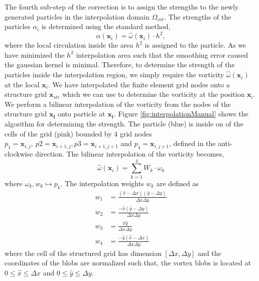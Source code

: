 The fourth sub-step of the correction is to assign the strengths to the newly generated particles in the interpolation domain $\Omega_{int}$. The strengths of the particles $\alpha_i$ is determined using the standard method,
\begin{equation}
\alpha(\mathbf{x}_i) = \hat{\omega}(\mathbf{x}_i) \cdot h^2,
\end{equation}
where the local circulation inside the area $h^2$ is assigned to the particle. As we have minimized the $h^2$ interpolation area such that the smoothing error caused the gaussian kernel is minimal. Therefore, to determine the strength of the particles inside the interpolation region, we simply require the vorticity $\hat{\omega}(\mathbf{x}_i)$ at the local $\mathbf{x}_i$. We have interpolated the finite element grid nodes onto a structure grid $\mathbf{x}_{str}$ which we can use to determine the vorticity at the position $\mathbf{x}_i$. We perform a bilinear interpolation of the vorticity from the nodes of the structure grid $\mathbf{x_i}$ onto particle at $\mathbf{x_i}$. Figure \ref{fig:interpolationManual} shows the algorithm for determining the strength. The particle (blue) is inside on of the cells of the grid (pink) bounded by 4 grid nodes $p_1 = \mathbf{x}_{i,j},\ p2  = \mathbf{x}_{i+1,j}, p3 = \mathbf{x}_{i+1,j+1}$ and $ p_4 = \mathbf{x}_{i,j+1}$, defined in the anti-clockwise direction. The bilinear interpolation of the vorticity becomes,
	\begin{equation}
	\hat{\omega}(\mathbf{x}_i) = \sum_{k=1}^4 W_k\cdot \omega_k
	\end{equation}
where $\omega_k, w_k \mapsto p_k$. The interpolation weights $w_k$ are defined as 
	\begin{equation}
	\begin{aligned}
	w_1 &= \frac{(\hat{x} - \Delta x )(\hat{y}-\Delta y)}{\Delta x \Delta y}\\
	w_2 &= \frac{-\hat{x}(\hat{y}-\Delta y)}{\Delta x \Delta y}\\
	w_3 &= \frac{\hat{x} \hat{y}}{\Delta x \Delta y}\\
	w_4 &= \frac{-\hat{y}(\hat{x} - \Delta x )}{\Delta x \Delta y}
	\end{aligned}
	\end{equation}
where the cell of the structured grid has dimension $[\Delta x, \Delta y]$ and the coordinates of the blobs are normalized such that, the vortex blobs is located at $0\leqslant\hat{x}\leqslant\Delta x$ and $0\leqslant\hat{y}\leqslant\Delta y$.
	
